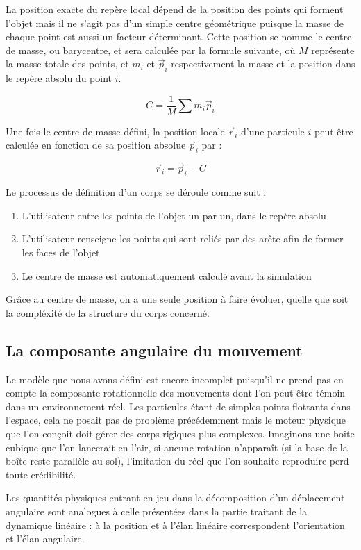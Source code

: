 

La position exacte du repère local dépend de la position des points qui forment l'objet mais il ne s'agit pas d'un simple centre géométrique puisque la masse de chaque point est aussi un facteur déterminant. Cette position se nomme le centre de masse, ou barycentre, et sera calculée par la formule suivante, o\`u $M$ représente la masse totale des points, et $m_i$ et $\vec{p}_i$ respectivement la masse et la position dans le repère absolu du point $i$.

\[C = \frac{1}{M} \sum m_i \vec{p}_i\]

Une fois le centre de masse défini, la position locale $\vec{r}_i$ d'une particule $i$ peut être calculée en fonction de sa position absolue $\vec{p}_i$ par :

\[\vec{r}_i = \vec{p}_i - C\]

Le processus de définition d'un corps se déroule comme suit :
\begin{enumerate}
  \item{L'utilisateur entre les points de l'objet un par un, dans le repère absolu}
  \item{L'utilisateur renseigne les points qui sont reliés par des arête afin de former les faces de l'objet}
  \item{Le centre de masse est automatiquement calculé avant la simulation}
\end{enumerate}

Grâce au centre de masse, on a une seule position à faire évoluer, quelle que soit la compléxité de la structure du corps concerné.

\subsection{La composante angulaire du mouvement}

Le modèle que nous avons défini est encore incomplet puisqu'il ne prend pas en compte la composante rotationnelle des mouvements dont l'on peut être témoin dans un environnement réel. Les particules étant de simples points flottants dans l'espace, cela ne posait pas de problème précédemment mais le moteur physique que l'on conçoit doit gérer des corps rigiques plus complexes. Imaginons une boîte cubique que l'on lancerait en l'air, si aucune rotation n'apparaît (si la base de la boîte reste parallèle au sol), l'imitation du réel que l'on souhaite reproduire perd toute crédibilité.

Les quantités physiques entrant en jeu dans la décomposition d'un déplacement angulaire sont analogues à celle présentées dans la partie traitant de la dynamique linéaire : à la position et à l'élan linéaire correspondent l'orientation et l'élan angulaire.

